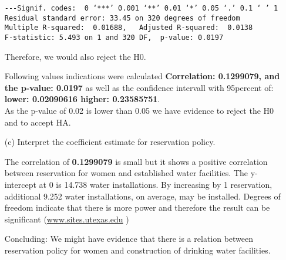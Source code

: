 \documentclass[12pt,letterpaper]{article}
\begin{document}
\begin{enumerate}
\begin{verbatim}
---Signif. codes:  0 ‘***’ 0.001 ‘**’ 0.01 ‘*’ 0.05 ‘.’ 0.1 ‘ ’ 1
Residual standard error: 33.45 on 320 degrees of freedom
Multiple R-squared:  0.01688,	Adjusted R-squared:  0.0138 
F-statistic: 5.493 on 1 and 320 DF,  p-value: 0.0197
\end{verbatim}
Therefore, we would also reject the H0.

Following values indications were calculated  \textbf{Correlation: 0.1299079, and the p-value: 0.0197} as well as the confidence intervall with 95percent of: \textbf{lower:  0.02090616 higher: 0.23585751}. \\

As the p-value of 0.02 is lower than 0.05 we have evidence to reject the H0 and to accept HA.

	\vspace{.5cm}
	\item [(c)] Interpret the coefficient estimate for reservation policy. 
	
	The correlation of \textbf{0.1299079} is small but it shows a positive correlation between reservation for women and established water facilities. The y-intercept at 0 is 14.738 water installations. By increasing by 1 reservation, additional 9.252 water installations, on average, may be installed. Degrees of freedom indicate that there is more power and therefore the result can be significant (\href{	https://sites.utexas.edu/sos/degreesfreedom/#:~:text=Because%20higher%20degrees%20of%20freedom,and%20find%20a%20significant%20result.}{www.sites.utexas.edu} )
	
	Concluding: We might have evidence that there is a relation between reservation policy for women and construction of drinking water facilities.
	

	
\end{enumerate}
\end{document}
